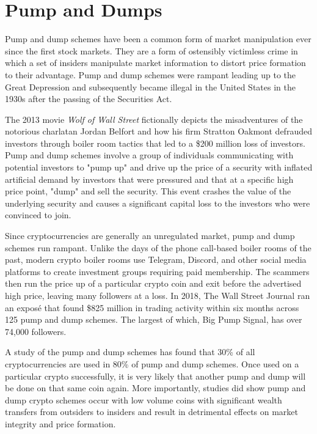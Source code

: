 
\section{Pump and Dumps}

Pump and dump schemes have been a common form of market manipulation ever since
the first stock markets. They are a form of ostensibly victimless crime in which
a set of insiders manipulate market information to distort price formation to
their advantage. Pump and dump schemes were rampant leading up to the Great
Depression and subsequently became illegal in the United States in the 1930s
after the passing of the Securities Act.


The 2013 movie \textit{Wolf of Wall Street} fictionally depicts the misadventures of
the notorious charlatan Jordan Belfort and how his firm Stratton Oakmont
defrauded investors through boiler room tactics that led to a \$200 million loss
of investors. Pump and dump schemes involve a group of individuals communicating
with potential investors to "pump up" and drive up the price of a security with
inflated artificial demand by investors that were pressured and that at a
specific high price point, "dump" and sell the security. This event crashes the
value of the underlying security and causes a significant capital loss to the
investors who were convinced to join.

Since cryptocurrencies are generally an unregulated market, pump and dump
schemes run rampant. Unlike the days of the phone call-based boiler rooms of the
past, modern crypto boiler rooms use Telegram, Discord, and other social media
platforms to create investment groups requiring paid membership. The scammers
then run the price up of a particular crypto coin and exit before the advertised
high price, leaving many followers at a loss. In 2018, The Wall Street Journal
ran an exposé that found \$825 million in trading activity within six months
across 125 pump and dump schemes. The largest of which, Big Pump Signal, has
over 74,000 followers. \cite{scheck_how_2018}


A study of the pump and dump schemes has found that 30\% of all cryptocurrencies
are used in 80\% of pump and dump schemes. Once used on a particular crypto
successfully, it is very likely that another pump and dump will be done on that
same coin again. More importantly, studies did show pump and dump crypto schemes
occur with low volume coins with significant wealth transfers from outsiders to
insiders and result in detrimental effects on market integrity and price
formation. \cite{xu_anatomy_2019, dhawan_new_2020, li_cryptocurrency_2019,
kamps_moon_2018, hamrick_economics_2018, hamrick_examination_2018}

